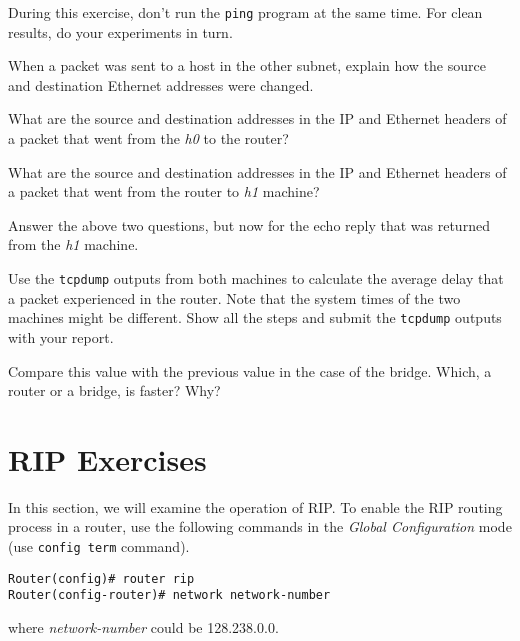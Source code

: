 \documentclass{../UTNetLab}
\begin{document}
    During this exercise, don’t run the \lstinline{ping} program at the same time.
    For clean results, do your experiments in turn.
    
    \begin{report}
        \item When a packet was sent to a host in the other subnet, explain how the source and destination Ethernet addresses were changed.
        
        \item What are the source and destination addresses in the IP and Ethernet headers of a packet that went from the \textit{h0} to the router?
        
        \item What are the source and destination addresses in the IP and Ethernet headers of a packet that went from the router to \textit{h1} machine?
        
        \item Answer the above two questions, but now for the echo reply that was returned from the \textit{h1} machine.

        \item Use the \lstinline{tcpdump} outputs from both machines to calculate the average delay that a packet experienced in the router.
                Note that the system times of the two machines might be different.
                Show all the steps and submit the \lstinline{tcpdump} outputs with your report.
        
        \item Compare this value with the previous value in the case of the bridge.
                Which, a router or a bridge, is faster? Why?
    \end{report}

\part{RIP Exercises}\label{sec:rip}
    In this section, we will examine the operation of RIP.
    To enable the RIP routing process in a router, use the following commands in the \textit{Global Configuration} mode (use \lstinline[language={cisco}]{config term} command).
    \begin{lstlisting}[language={cisco}, emph={network-number}]
Router(config)# router rip
Router(config-router)# network network-number
    \end{lstlisting}
    where \textit{network-number} could be 128.238.0.0.
    
\end{document}
